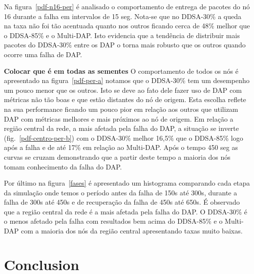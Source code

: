 \documentclass[conference]{IEEEtran}
\begin{document}
Na figura~\ref{pdf-n16-per} é analisado o comportamento de entrega de pacotes do nó 16 durante a falha em intervalos de 15 seg. Nota-se que no DDSA-30\% a queda na taxa não foi tão acentuada quanto nos outros ficando cerca de 48\% melhor que o DDSA-85\% e o Multi-DAP. Isto evidencia que a tendência de distribuir mais pacotes do DDSA-30\% entre os DAP o torna mais robusto que os outros quando ocorre uma falha de DAP.

\textbf{Colocar que é em todas as sementes} O comportamento de todos os nós é apresentado na figura~\ref{pdf-per-a} notamos que o DDSA-30\% tem um desempenho um pouco menor que os outros. Isto se deve ao fato dele fazer uso de DAP com métricas não tão boas e que estão distantes do nó de origem. Esta escolha reflete na sua performance ficando um pouco pior em relação aos outros que utilizam DAP com métricas melhores e mais próximos ao nó de origem. Em relação a região central da rede, a mais afetada pela falha do DAP, a situação se inverte (fig.~\ref{pdf-centro-per-b}) com o DDSA-30\% melhor 16,5\% que o DDSA-85\% logo após a falha e de até 17\% em relação ao Multi-DAP. Após o tempo 450 seg as curvas se cruzam demonstrando que a partir deste tempo a maioria dos nós tomam conhecimento da falha do DAP.

Por último na figura~\ref{fases} é apresentado um histograma comparando cada etapa da simulação onde temos o período antes da falha de 150s até 300s, durante a falha de 300s até 450s e de recuperação da falha de 450s até 650s. É observado que a região central da rede é a mais afetada pela falha do DAP. O DDSA-30\% é o menos afetado pela falha com resultados bem acima do DDSA-85\% e o Multi-DAP com a maioria dos nós da região central apresentando taxas muito baixas.




\section{Conclusion}






\end{document}
